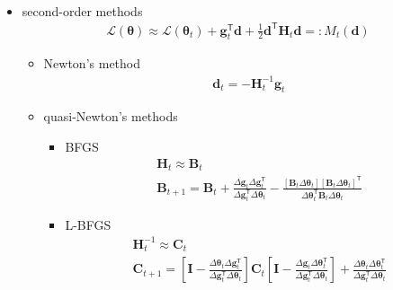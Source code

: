 \begin{itemize}
\begin{itemize}
\begin{itemize}
\begin{gather}
            \end{gather}
        \end{itemize}
    \end{itemize}
    \item second-order methods 
    \begin{gather}
        \mathcal{L}(\bm{\theta})\approx\mathcal{L}(\bm{\theta}_t)+\bm{g}_t^\mathsf{T}\bm{d}+\frac{1}{2}\bm{d}^\mathsf{T}\mathbf{H}_t\bm{d}=:M_t(\bm{d})
    \end{gather}
    \begin{itemize}
        \item Newton's method 
        \begin{gather}
            \bm{d}_{t} = -\mathbf{H}_t^{-1}\bm{g}_t
        \end{gather}
        \item quasi-Newton's methods 
        \begin{itemize}
            \item BFGS
            \begin{gather}
                \mathbf{H}_t \approx \mathbf{B}_t\\
                \mathbf{B}_{t+1} = \mathbf{B}_t
                   + \frac{\Delta\bm{g}_t\Delta\bm{g}_t^\mathsf{T}}{\Delta\bm{g}_t^\mathsf{T}\Delta\bm{\theta}_t}
                   - \frac{[\mathbf{B}_t\Delta\bm{\theta}_t][\mathbf{B}_t\Delta\bm{\theta}_t]^\mathsf{T}}{\Delta\bm{\theta}_t^\mathsf{T}\mathbf{B}_t\Delta\bm{\theta}_t}
            \end{gather}
            \item L-BFGS
            \begin{gather}
                \mathbf{H}_t^{-1} \approx \mathbf{C}_t \\
                \mathbf{C}_{t+1} = 
                    \left[
                        \mathbf{I}-\frac{\Delta\bm{\theta}_t\Delta\bm{g}_t^\mathsf{T}}{\Delta\bm{g}_t^\mathsf{T}\Delta\bm{\theta}_t}
                    \right]
                    \mathbf{C}_t
                    \left[
                        \mathbf{I}-\frac{\Delta\bm{g}_t\Delta\bm{\theta}_t^\mathsf{T}}{\Delta\bm{g}_t^\mathsf{T}\Delta\bm{\theta}_t}
                    \right]
                    + \frac{\Delta\bm{\theta}_t\Delta\bm{\theta}_t^\mathsf{T}}{\Delta\bm{g}_t^\mathsf{T}\Delta\bm{\theta}_t}

\end{gather}
\end{itemize}
\end{itemize}
\end{itemize}
